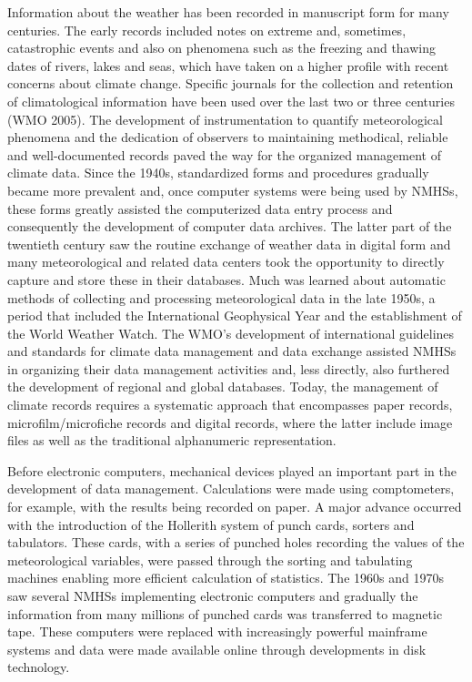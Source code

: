 Information about the weather has been recorded in manuscript form for many centuries. The
early records included notes on extreme and, sometimes, catastrophic events and also on
phenomena such as the freezing and thawing dates of rivers, lakes and seas, which have taken
on a higher profile with recent concerns about climate change.
Specific journals for the collection and retention of climatological information have been used
over the last two or three centuries (WMO 2005). The development of instrumentation to quantify
meteorological phenomena and the dedication of observers to maintaining methodical, reliable
and well-documented records paved the way for the organized management of climate data.
Since the 1940s, standardized forms and procedures gradually became more prevalent and,
once computer systems were being used by NMHSs, these forms greatly assisted the
computerized data entry process and consequently the development of computer data archives.
The latter part of the twentieth century saw the routine exchange of weather data in digital form
and many meteorological and related data centers took the opportunity to directly capture and
store these in their databases. Much was learned about automatic methods of collecting and
processing meteorological data in the late 1950s, a period that included the International
Geophysical Year and the establishment of the World Weather Watch. The WMO’s development
of international guidelines and standards for climate data management and data exchange
assisted NMHSs in organizing their data management activities and, less directly, also furthered
the development of regional and global databases. Today, the management of climate records
requires a systematic approach that encompasses paper records, microfilm/microfiche records
and digital records, where the latter include image files as well as the traditional alphanumeric
representation.

Before electronic computers, mechanical devices played an important part in the development
of data management. Calculations were made using comptometers, for example, with the results
being recorded on paper. A major advance occurred with the introduction of the Hollerith system
of punch cards, sorters and tabulators. These cards, with a series of punched holes recording
the values of the meteorological variables, were passed through the sorting and tabulating
machines enabling more efficient calculation of statistics.
The 1960s and 1970s saw several NMHSs implementing electronic computers and gradually the
information from many millions of punched cards was transferred to magnetic tape. These
computers were replaced with increasingly powerful mainframe systems and data were made
available online through developments in disk technology.

